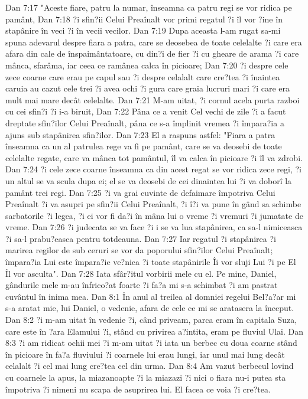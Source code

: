 Dan 7:17  "Aceste fiare, patru la numar, înseamna ca patru regi se vor ridica pe pamânt,
Dan 7:18  ?i sfin?ii Celui Preaînalt vor primi regatul ?i îl vor ?ine în stapânire în veci ?i în vecii vecilor.
Dan 7:19  Dupa aceasta l-am rugat sa-mi spuna adevarul despre fiara a patra, care se deosebea de toate celelalte ?i care era afara din cale de înspaimântatoare, cu din?i de fier ?i cu gheare de arama ?i care mânca, sfarâma, iar ceea ce ramânea calca în picioare;
Dan 7:20  ?i despre cele zece coarne care erau pe capul sau ?i despre celalalt care cre?tea ?i înaintea caruia au cazut cele trei ?i avea ochi ?i gura care graia lucruri mari ?i care era mult mai mare decât celelalte.
Dan 7:21  M-am uitat, ?i cornul acela purta razboi cu cei sfin?i ?i i-a biruit,
Dan 7:22  Pâna ce a venit Cel vechi de zile ?i a facut dreptate sfin?ilor Celui Preaînalt, pâna ce s-a împlinit vremea ?i împara?ia a ajuns sub stapânirea sfin?ilor.
Dan 7:23  El a raspuns astfel: "Fiara a patra înseamna ca un al patrulea rege va fi pe pamânt, care se va deosebi de toate celelalte regate, care va mânca tot pamântul, îl va calca în picioare ?i îl va zdrobi.
Dan 7:24  ?i cele zece coarne înseamna ca din acest regat se vor ridica zece regi, ?i un altul se va scula dupa ei; el se va deosebi de cei dinaintea lui ?i va doborî la pamânt trei regi.
Dan 7:25  ?i va grai cuvinte de defaimare împotriva Celui Preaînalt ?i va asupri pe sfin?ii Celui Preaînalt, ?i î?i va pune în gând sa schimbe sarbatorile ?i legea, ?i ei vor fi da?i în mâna lui o vreme ?i vremuri ?i jumatate de vreme.
Dan 7:26  ?i judecata se va face ?i i se va lua stapânirea, ca sa-l nimiceasca ?i sa-l prabu?easca pentru totdeauna.
Dan 7:27  Iar regatul ?i stapânirea ?i marirea regilor de sub ceruri se vor da poporului sfin?ilor Celui Preaînalt; împara?ia Lui este împara?ie ve?nica ?i toate stapânirile Îi vor sluji Lui ?i pe El Îl vor asculta".
Dan 7:28  Iata sfâr?itul vorbirii mele cu el. Pe mine, Daniel, gândurile mele m-au înfrico?at foarte ?i fa?a mi s-a schimbat ?i am pastrat cuvântul în inima mea.
Dan 8:1  În anul al treilea al domniei regelui Bel?a?ar mi s-a aratat mie, lui Daniel, o vedenie, afara de cele ce mi se aratasera la început.
Dan 8:2  ?i m-am uitat în vedenie ?i, când priveam, parca eram în capitala Suza, care este în ?ara Elamului ?i, stând cu privirea a?intita, eram pe fluviul Ulai.
Dan 8:3  ?i am ridicat ochii mei ?i m-am uitat ?i iata un berbec cu doua coarne stând în picioare în fa?a fluviului ?i coarnele lui erau lungi, iar unul mai lung decât celalalt ?i cel mai lung cre?tea cel din urma.
Dan 8:4  Am vazut berbecul lovind cu coarnele la apus, la miazanoapte ?i la miazazi ?i nici o fiara nu-i putea sta împotriva ?i nimeni nu scapa de asuprirea lui. El facea ce voia ?i cre?tea.
